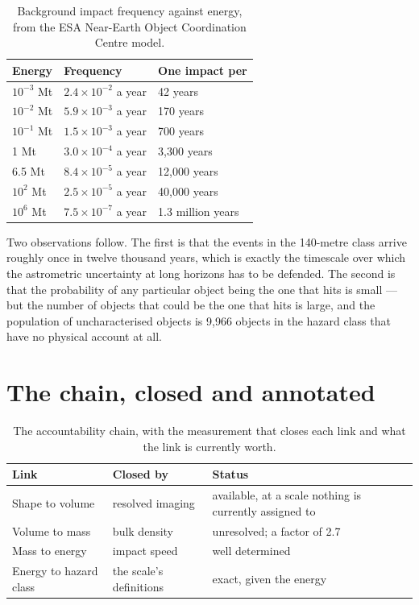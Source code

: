 \begin{table}[!htbp]
\centering
\small
\caption{Background impact frequency against energy, from the ESA Near-Earth
Object Coordination Centre model.}
\label{tab:background}
\begin{tabularx}{\textwidth}{@{}P{1.16in}P{1.40in}Y@{}}
\toprule
{}
\textbf{Energy} & \textbf{Frequency} & \textbf{One impact per} \\
\midrule
\(10^{-3}\) Mt & \(2.4\times 10^{-2}\) a year & 42 years \\
\(10^{-2}\) Mt & \(5.9\times 10^{-3}\) a year & 170 years \\
\(10^{-1}\) Mt & \(1.5\times 10^{-3}\) a year & 700 years \\
1 Mt & \(3.0\times 10^{-4}\) a year & 3,300 years \\
6.5 Mt & \(8.4\times 10^{-5}\) a year & 12,000 years \\
\(10^{2}\) Mt & \(2.5\times 10^{-5}\) a year & 40,000 years \\
\(10^{6}\) Mt & \(7.5\times 10^{-7}\) a year & 1.3 million years \\
\bottomrule
\end{tabularx}
\end{table}

Two observations follow. The first is that the events in the 140-metre class
arrive roughly once in twelve thousand years, which is exactly the timescale
over which the astrometric uncertainty at long horizons has to be defended.
The second is that the probability of any particular object being the one
that hits is small --- but the number of objects that could be the one that
hits is large, and the population of uncharacterised objects is 9,966
objects in the hazard class that have no physical account at all.

\section{The chain, closed and annotated}

\begin{table}[!htbp]
\centering
\small
\caption{The accountability chain, with the measurement that closes each
link and what the link is currently worth.}
\label{tab:accountability-chain}
\begin{tabularx}{\textwidth}{@{}P{1.24in}P{1.32in}Y@{}}
\toprule
{}
\textbf{Link} & \textbf{Closed by} & \textbf{Status} \\
\midrule
Shape to volume & resolved imaging & available, at a scale nothing is
currently assigned to \\
Volume to mass & bulk density & unresolved; a factor of 2.7 \\
Mass to energy & impact speed & well determined \\
Energy to hazard class & the scale's definitions & exact, given the energy \\
\bottomrule
\end{tabularx}
\end{table}

